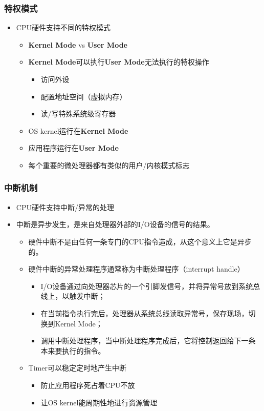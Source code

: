 \documentclass[UTF8]{ctexbeamer}
\begin{document}
\begin{frame}
	\frametitle{特权模式}
	\begin{itemize}
		\item CPU硬件支持不同的特权模式
		\begin{itemize}
			\item \textbf{Kernel Mode} vs \textbf{User Mode}
			\item \textbf{Kernel Mode}可以执行\textbf{User Mode}无法执行的特权操作
			\begin{itemize}
				\item 访问外设
				\item 配置地址空间（虚拟内存）
				\item 读/写特殊系统级寄存器
			\end{itemize}			
			
			\item OS kernel运行在\textbf{Kernel Mode} 
			\item 应用程序运行在\textbf{User Mode}
			\item 每个重要的微处理器都有类似的用户/内核模式标志
				
		\end{itemize}
	\end{itemize}
\end{frame}


\begin{frame}
	\frametitle{中断机制}
	\begin{itemize}
		\item CPU硬件支持中断/异常的处理
		\item 中断是异步发生，是来自处理器外部的I/O设备的信号的结果。
		\begin{itemize}
			\item 硬件中断不是由任何一条专门的CPU指令造成，从这个意义上它是异步的。
			\item 硬件中断的异常处理程序通常称为中断处理程序（interrupt handle）
			\begin{itemize}
				\item I/O设备通过向处理器芯片的一个引脚发信号，并将异常号放到系统总线上，以触发中断；
				\item 在当前指令执行完后，处理器从系统总线读取异常号，保存现场，切换到Kernel Mode；
				\item 调用中断处理程序，当中断处理程序完成后，它将控制返回给下一条本来要执行的指令。
			\end{itemize}			
			
			\item Timer可以稳定定时地产生中断
			\begin{itemize}
				\item 防止应用程序死占着CPU不放
				\item 让OS kernel能周期性地进行资源管理
			\end{itemize}				
		\end{itemize}
	\end{itemize}
\end{frame}

\end{document}
